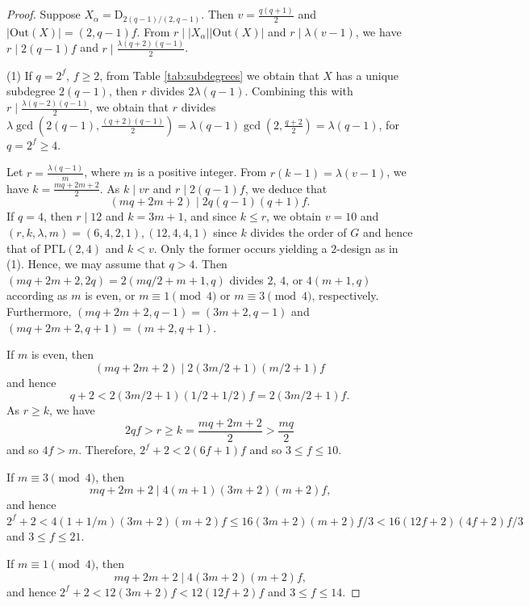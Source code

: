 \documentclass[a4paper,twopage,reqno,12pt]{amsart}
\theoremstyle{definition}
\numberwithin{equation}{section}
\newcommand{\PGaL}{\mathrm{P\Gamma L}}
\newcommand{\Out}{\mathrm{Out}}
\renewcommand{\leq}{\leqslant}
\renewcommand{\geq}{\geqslant}
\begin{document}
\begin{proof}
Suppose $X_{\alpha}=\mathrm{D}_{2(q-1)/(2,q-1)}$. 
Then $v=\frac{q(q+1)}{2}$ and $|\Out(X)|=(2,q-1)f$.
From $r\mid |X_{\alpha}||\Out(X)|$ and 
$r\mid \lambda(v-1)$, we have $r\mid 2(q-1)f$ and $r\mid \frac{\lambda(q+2)(q-1)}{2}$.


(1) If $q=2^f$, $f \geq 2$, from Table \ref{tab:subdegrees} we obtain that $X$ has a unique subdegree $2(q-1)$, 
then $r$ divides $2\lambda(q-1)$.
Combining this with $r\mid \frac{\lambda(q-2)(q-1)}{2}$,
we obtain that $r$ divides $\lambda\gcd(2(q-1), \frac{(q+2)(q-1)}{2})=\lambda(q-1)\gcd(2,\frac{q+2}{2})=\lambda(q-1)$,
for $q=2^f\ge 4$.

Let $r=\frac{\lambda(q-1)}{m}$, where $m$ is a positive integer.
From $r(k-1)=\lambda(v-1)$, we have $k=\frac{mq+2m+2}{2}$.
As $k\mid vr$ and $r\mid 2(q-1)f$,  we deduce that 
\[
(mq+2m+2)\mid 2q(q-1)(q+1)f.
\]
If $q=4$, then $r\mid 12$ and $k=3m+1$, and since $k\leq r$, we obtain $v=10$ and $(r,k,\lambda,m)=(6,4,2,1),(12,4,4,1)$ since $k$ divides the order of $G$ and hence that of $\PGaL(2,4)$ and $k<v$. Only the former occurs yielding a $2$-design as in (1). Hence, we may assume that $q>4$. Then $(mq+2m+2,2q)=2(mq/2+m+1,q)$ divides $2$, $4$, or $4(m+1,q)$ according as $m$ is even, or $m \equiv 1 \pmod{4}$ or $m \equiv 3 \pmod{4}$, respectively. 
Furthermore, $(mq+2m+2,q-1)=(3m+2,q-1)$ and $(mq+2m+2,q+1)=(m+2,q+1)$. %

If $m$ is even, then %
$$(mq+2m+2)\mid 2(3m/2+1)(m/2+1)f$$
and hence $$q+2 < 2(3m/2+1)(1/2+1/2)f=2(3m/2+1)f\text{.}$$
As $r\ge k$, we have
\[
2qf> r\ge k=\frac{mq+2m+2}{2}>\frac{mq}{2}
\]
 and so $4f>m$. Therefore, $2^{f}+2<2(6f+1)f$ and so $3\leq f \leq 10$.

If $m \equiv 3 \pmod{4}$, then %
$$mq+2m+2 \mid 4(m+1)(3m+2)(m+2)f\text{,}$$
and hence
$2^{f}+2 < 4(1+1/m)(3m+2)(m+2)f\leq 16(3m+2)(m+2)f/3 < 16(12f+2)(4f+2)f/3$ and $3\leq f\leq 21$.

If $m \equiv 1 \pmod{4}$, then $$mq+2m+2 \mid 4(3m+2)(m+2)f\text{,}$$ and hence $2^f+2<12(3m+2)f<12(12f+2)f$ and $3\le f \le 14$.


\end{proof}
\end{document}
